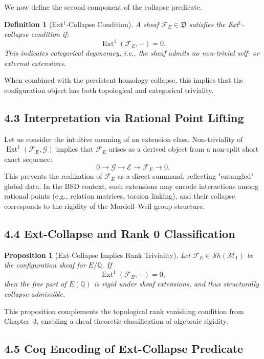\documentclass[11pt]{article}
\newtheorem{definition}[theorem]{Definition}
\newtheorem{proposition}[theorem]{Proposition}
\DeclareMathOperator{\Ext}{Ext}
\begin{document}
We now define the second component of the collapse predicate.

\begin{definition}[Ext$^1$-Collapse Condition]
\label{def:ext-collapse}
A sheaf \( \mathcal{F}_E \in \mathfrak{D} \) satisfies the \emph{Ext$^1$-collapse condition} if:
\[
\Ext^1(\mathcal{F}_E, -) = 0.
\]
This indicates categorical degeneracy, i.e., the sheaf admits no non-trivial self- or external extensions.
\end{definition}

When combined with the persistent homology collapse, this implies that the configuration object has both topological and categorical triviality.

\subsection*{4.3 Interpretation via Rational Point Lifting}

Let us consider the intuitive meaning of an extension class. Non-triviality of \( \Ext^1(\mathcal{F}_E, \mathcal{G}) \) implies that \( \mathcal{F}_E \) arises as a derived object from a non-split short exact sequence:
\[
0 \to \mathcal{G} \to \mathcal{E} \to \mathcal{F}_E \to 0.
\]
This prevents the realization of \( \mathcal{F}_E \) as a direct summand, reflecting "entangled" global data. In the BSD context, such extensions may encode interactions among rational points (e.g., relation matrices, torsion linking), and their collapse corresponds to the rigidity of the Mordell–Weil group structure.

\subsection*{4.4 Ext-Collapse and Rank 0 Classification}

\begin{proposition}[Ext-Collapse Implies Rank Triviality]
\label{prop:ext-collapse-implies-trivial}
Let \( \mathcal{F}_E \in \mathcal{S}h(\mathcal{M}_1) \) be the configuration sheaf for \( E/\mathbb{Q} \). If
\[
\Ext^1(\mathcal{F}_E, -) = 0,
\]
then the free part of \( E(\mathbb{Q}) \) is rigid under sheaf extensions, and thus structurally collapse-admissible.
\end{proposition}

This proposition complements the topological rank vanishing condition from Chapter~3, enabling a sheaf-theoretic classification of algebraic rigidity.

\subsection*{4.5 Coq Encoding of Ext-Collapse Predicate}
\end{document}

